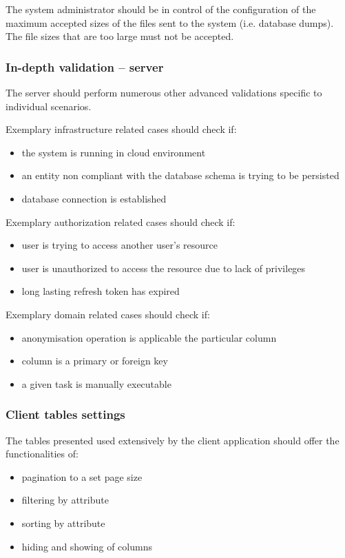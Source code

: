 \documentclass[a4paper,twoside,12pt]{book}
\begin{document}
The system administrator should be in control of the configuration of the maximum accepted sizes of the files sent to the system (i.e. database dumps). The file sizes that are too large must not be accepted.

\subsubsection{In-depth validation – server}

The server should perform numerous other advanced validations specific to individual scenarios.

Exemplary infrastructure related cases should check if:
\begin{itemize}
\item the system is running in cloud environment
\item an entity non compliant with the database schema is trying to be persisted
\item database connection is established
\end{itemize}

Exemplary authorization related cases should check if:
\begin{itemize}
\item user is trying to access another user's resource
\item user is unauthorized to access the resource due to lack of privileges
\item long lasting refresh token has expired
\end{itemize}

Exemplary domain related cases should check if:
\begin{itemize}
\item anonymisation operation is applicable the particular column
\item column is a primary or foreign key
\item a given task is manually executable
\end{itemize}

\subsubsection{Client tables settings}
The tables presented used extensively by the client application should offer the functionalities of:

\begin{itemize}
\item pagination to a set page size
\item filtering by attribute
\item sorting by attribute
\item hiding and showing of columns
\end{itemize}
\end{document}
